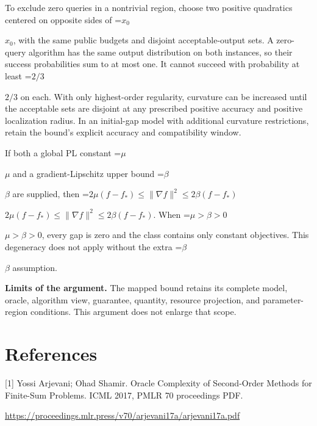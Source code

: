 \documentclass[10pt,a4paper]{article}
\newcommand{\AtlasMath}[1]{\par\begingroup\centering\setbox0=\hbox{$\displaystyle #1$}\ifdim\wd0>1.4\linewidth\typeout{ATLAS WIDE FORMULA: \the\wd0}\fi\ifdim\wd0>\linewidth\resizebox{\linewidth}{!}{\box0}\else\box0\fi\par\endgroup}
\newcommand{\AtlasInlineMath}[1]{\begingroup\setbox0=\hbox{$#1$}\ifdim\wd0>.4\linewidth\endgroup\AtlasMath{#1}\else\endgroup$#1$\fi}
\begin{document}
To exclude zero queries in a nontrivial region, choose two positive quadratics centered on opposite sides of \AtlasInlineMath{x_0}, with the same public budgets and disjoint acceptable-output sets. A zero-query algorithm has the same output distribution on both instances, so their success probabilities sum to at most one. It cannot succeed with probability at least \AtlasInlineMath{2/3} on each. With only highest-order regularity, curvature can be increased until the acceptable sets are disjoint at any prescribed positive accuracy and positive localization radius. In an initial-gap model with additional curvature restrictions, retain the bound's explicit accuracy and compatibility window.

If both a global PL constant \AtlasInlineMath{\mu} and a gradient-Lipschitz upper bound \AtlasInlineMath{\beta} are supplied, then \AtlasInlineMath{2\mu(f-f_*)\le\|\nabla f\|^2\le2\beta(f-f_*)}. When \AtlasInlineMath{\mu>\beta>0}, every gap is zero and the class contains only constant objectives. This degeneracy does not apply without the extra \AtlasInlineMath{\beta} assumption.

\textbf{Limits of the argument.} The mapped bound retains its complete model, oracle, algorithm view, guarantee, quantity, resource projection, and parameter-region conditions. This argument does not enlarge that scope.

\section{References}
[1] Yossi Arjevani; Ohad Shamir. Oracle Complexity of Second-Order Methods for Finite-Sum Problems. ICML 2017, PMLR 70 proceedings PDF.

\url{https://proceedings.mlr.press/v70/arjevani17a/arjevani17a.pdf}
\end{document}
